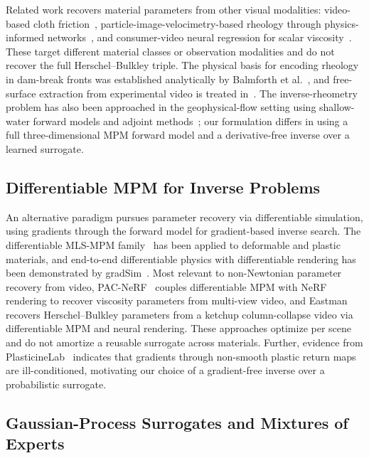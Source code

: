 Related work recovers material parameters from other visual modalities:
video-based cloth friction~\cite{rasheed2020visual},
particle-image-velocimetry-based rheology through physics-informed
networks~\cite{thakur2025learning}, and consumer-video neural regression
for scalar viscosity~\cite{rauzan2024protorheology}. These target
different material classes or observation modalities and do not recover
the full Herschel--Bulkley triple. The physical basis for encoding
rheology in dam-break fronts was established analytically by
Balmforth et al.~\cite{balmforth2007two}, and free-surface extraction
from experimental video is treated in~\cite{cochard2009tracking}. The
inverse-rheometry problem has also been approached in the
geophysical-flow setting using shallow-water forward models and adjoint
methods~\cite{martin2010inverse}; our formulation differs in using a
full three-dimensional MPM forward model and a derivative-free inverse
over a learned surrogate.


\subsection{Differentiable MPM for Inverse Problems}

An alternative paradigm pursues parameter recovery via differentiable
simulation, using gradients through the forward model for gradient-based
inverse search. The differentiable MLS-MPM
family~\cite{hu2019chainqueen,hu2020difftaichi,huang2021plasticinelab}
has been applied to deformable and plastic materials, and end-to-end
differentiable physics with differentiable rendering has been
demonstrated by gradSim~\cite{murthy2021gradsim}. Most relevant to
non-Newtonian parameter recovery from video,
PAC-NeRF~\cite{li2023pacnerf} couples differentiable MPM with NeRF
rendering to recover viscosity parameters from multi-view video, and
Eastman~\cite{eastman2024recovery} recovers Herschel--Bulkley parameters
from a ketchup column-collapse video via differentiable MPM and neural
rendering. These approaches optimize per scene and do not amortize a
reusable surrogate across materials. Further, evidence from
PlasticineLab~\cite{huang2021plasticinelab} indicates that gradients
through non-smooth plastic return maps are ill-conditioned, motivating
our choice of a gradient-free inverse over a probabilistic surrogate.


\subsection{Gaussian-Process Surrogates and Mixtures of Experts}

